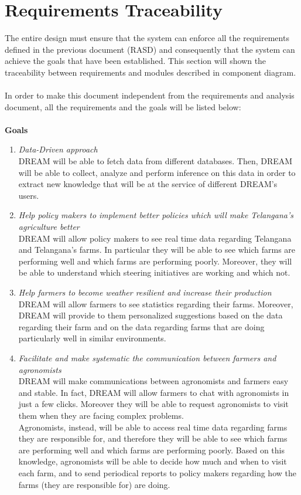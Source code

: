 \documentclass[10pt]{report}
\begin{document}
\chapter{Requirements Traceability}
The entire design must ensure that the system can enforce all the requirements defined in the previous document (RASD) and consequently that the system can achieve the goals that have been established. This section will shown the traceability between requirements and modules described in component diagram.\\ \\
In order to make this document independent from the requirements and analysis document, all the requirements and the goals will be listed below:\\ \\
\textbf{Goals}
\begin{enumerate} [label=(G\arabic*), font=\itshape]
    \item \emph{Data-Driven approach}\\DREAM will be able to fetch data from different databases. Then, DREAM will be able to collect, analyze and perform inference on this data in order to extract new knowledge that will be at the service of different DREAM’s users.
    \item \emph{Help policy makers to implement better policies which will make Telangana’s agriculture better}\\DREAM will allow policy makers to see real time data regarding Telangana and Telangana’s farms. In particular they will be able to see which farms are performing well and which farms are performing poorly. Moreover, they will be able to understand which steering initiatives are working and which not.
    \item \emph{Help farmers to become weather resilient and increase their production} \\DREAM will allow farmers to see statistics regarding their farms. Moreover, DREAM will provide to them personalized suggestions based on the data regarding their farm and on the data regarding farms that are doing particularly well in similar environments.
    \item \emph{Facilitate and make systematic the communication between farmers and agronomists} \\DREAM will make communications between agronomists and farmers easy and stable. In fact, DREAM will allow farmers to chat with agronomists in just a few clicks. Moreover they will be able to request agronomists to visit them when they are facing complex problems. \\Agronomists, instead, will be able to access real time data regarding farms they are responsible for, and therefore they will be able to see which farms are performing well and which farms are performing poorly. Based on this knowledge, agronomists will be able to decide how much and when to visit each farm, and to send periodical reports to policy makers regarding how the farms (they are responsible for) are doing.

\end{enumerate}
\end{document}
